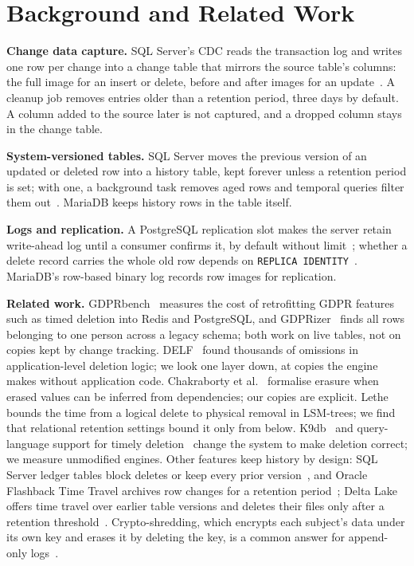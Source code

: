 \documentclass[runningheads]{llncs}
\begin{document}
\section{Background and Related Work}

\textbf{Change data capture.} SQL Server's CDC reads the transaction log and
writes one row per change into a change table that mirrors the source table's
columns: the full image for an insert or delete, before and after images for an
update~\cite{mscdc}. A cleanup job removes entries older than a retention
period, three days by default. A column added to the source later is not
captured, and a dropped column stays in the change table.

\textbf{System-versioned tables.} SQL Server moves the previous version of an
updated or deleted row into a history table, kept forever unless a retention
period is set; with one, a background task removes aged rows and temporal
queries filter them out~\cite{mstemporal}. MariaDB keeps history rows in the
table itself.

\begin{sloppypar}
\textbf{Logs and replication.} A PostgreSQL replication slot makes the server
retain write-ahead log until a consumer confirms it, by default without
limit~\cite{pgconfig}; whether a delete record carries the whole old row
depends on \texttt{REPLICA IDENTITY}~\cite{pgaltertable}. MariaDB's row-based
binary log records row images for replication.
\end{sloppypar}

\textbf{Related work.} GDPRbench~\cite{shastri2020} measures the cost of
retrofitting GDPR features such as timed deletion into Redis and PostgreSQL,
and GDPRizer~\cite{agarwal2022} finds all rows belonging to one person across a
legacy schema; both work on live tables, not on copies kept by change tracking.
DELF~\cite{delf2020} found thousands of omissions in
application-level deletion logic; we look one layer down, at copies the engine
makes without application code. Chakraborty et
al.~\cite{chakraborty2025} formalise erasure when erased values can be inferred
from dependencies; our copies are explicit. Lethe~\cite{sarkar2020} bounds the
time from a logical delete to physical removal in LSM-trees; we find that
relational retention settings bound it only from below. K9db~\cite{k9db} and
query-language support for timely deletion~\cite{sarkar2022} change the system
to make deletion correct; we measure unmodified engines. Other features keep
history by design: SQL Server ledger tables block deletes or keep every prior
version~\cite{msledger}, and Oracle Flashback Time Travel archives row changes
for a retention period~\cite{oraclefta}; Delta Lake offers time travel over
earlier table versions and deletes their files only after a retention
threshold~\cite{delta}. Crypto-shredding, which encrypts each
subject's data under its own key and erases it by deleting the key, is a common
answer for append-only logs~\cite{verraes2019}.
\end{document}
